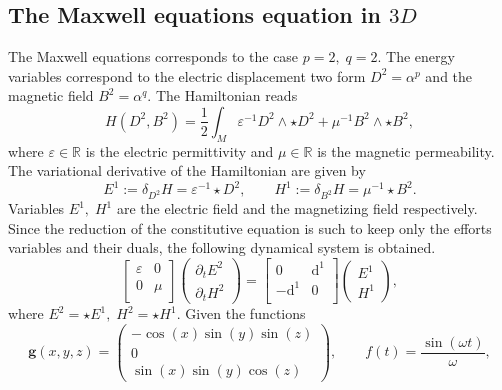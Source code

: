 \documentclass{elsarticle}
\renewcommand\d{\ensuremath{\mathrm{d}}}
\newcommand{\bbR}{\mathbb{R}}
\begin{document}
\subsection{The Maxwell equations equation in $3D$}
The Maxwell equations corresponds to the case $p=2, \; q=2$. The energy variables correspond to the electric displacement two form $D^2 = \alpha^p$ and the magnetic field $B^2=\alpha^q$. The Hamiltonian reads
\begin{equation}
    H(D^2, B^2) = \frac{1}{2} \int_M \varepsilon^{-1} D^2 \wedge \star D^2 + \mu^{-1} B^2 \wedge \star B^2,
\end{equation}
where $\varepsilon \in \bbR$ is the electric permittivity and $\mu \in \bbR$ is the magnetic permeability. The variational derivative of the Hamiltonian are given by 
\begin{equation}
    E^1 := \delta_{D^2} H = \varepsilon^{-1} \star D^2, \qquad H^1 := \delta_{B^2} H = \mu^{-1} \star B^2.
\end{equation}
Variables $E^1, \; H^1$ are the electric field and the magnetizing field respectively. Since the reduction of the constitutive equation is such to keep only the efforts variables and their duals, the following dynamical system is obtained.
\begin{equation}\label{eq:maxwell_eq}
\begin{bmatrix}
\varepsilon & 0 \\
0 & \mu \\
\end{bmatrix}
    \begin{pmatrix}
    \partial_t E^2\\
    \partial_t H^2
    \end{pmatrix} = 
    \begin{bmatrix}
    0 & \d^1 \\
    -\d^1 & 0 \\
    \end{bmatrix}
    \begin{pmatrix}
    {E}^1\\
    {H}^1
    \end{pmatrix},
\end{equation}
where $E^2 = \star E^1, \; H^2= \star H^1$. Given the functions
\begin{equation}
    \bm{g}(x, y, z) = \begin{pmatrix}
    -\cos(x)\sin(y)\sin(z) \\
    0 \\
    \sin(x)\sin(y)\cos(z)
    \end{pmatrix}, \qquad f(t) = \frac{\sin(\omega t)}{\omega},
\end{equation}
\end{document}
